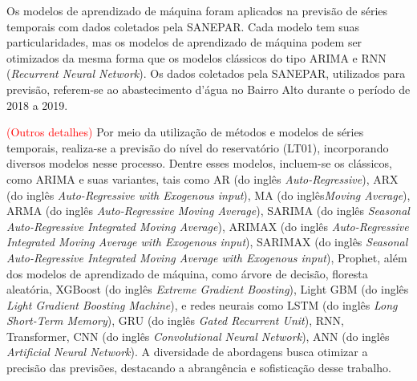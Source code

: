 Os modelos de aprendizado de máquina foram aplicados na previsão de séries temporais com dados coletados pela SANEPAR. Cada modelo tem suas particularidades, mas os modelos de aprendizado de máquina podem ser otimizados da mesma forma que os modelos clássicos do tipo ARIMA e RNN (\textit{Recurrent Neural Network}). Os dados coletados pela SANEPAR, utilizados para previsão, referem-se ao abastecimento d'água no Bairro Alto durante o período de 2018 a 2019.

\textcolor{red}{(Outros detalhes)} 
Por meio da utilização de métodos e modelos de séries temporais, realiza-se a previsão do nível do reservatório (LT01), incorporando diversos modelos nesse processo. Dentre esses modelos, incluem-se os clássicos, como ARIMA e suas variantes, tais como AR (do inglês \textit{Auto-Regressive}), ARX (do inglês \textit{Auto-Regressive with Exogenous input}), MA (do inglês\textit{Moving Average}), ARMA (do inglês \textit{Auto-Regressive Moving Average}), SARIMA (do inglês \textit{Seasonal Auto-Regressive Integrated Moving Average}), ARIMAX (do inglês \textit{Auto-Regressive Integrated Moving Average with Exogenous input}), SARIMAX (do inglês \textit{Seasonal Auto-Regressive Integrated Moving Average with Exogenous input}), Prophet, além dos modelos de aprendizado de máquina, como árvore de decisão, floresta aleatória, XGBoost (do inglês \textit{Extreme Gradient Boosting}), Light GBM (do inglês \textit{Light Gradient Boosting Machine}), e redes neurais como LSTM  (do inglês \textit{Long Short-Term Memory}), GRU (do inglês \textit{Gated Recurrent Unit}), RNN, Transformer, CNN (do inglês \textit{Convolutional Neural Network}), ANN (do inglês \textit{Artificial Neural Network}). A diversidade de abordagens busca otimizar a precisão das previsões, destacando a abrangência e sofisticação desse trabalho.



          

   

    

    

    